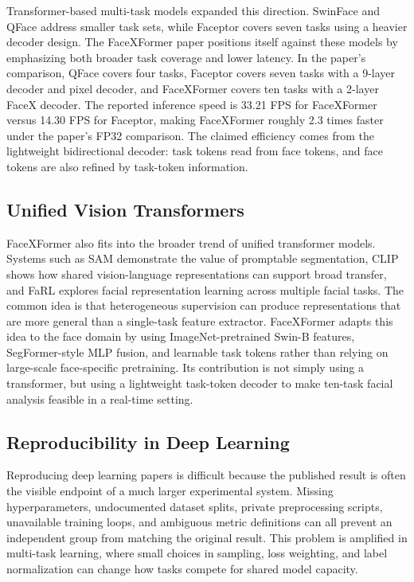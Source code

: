 \documentclass[11pt]{article}
\begin{document}
Transformer-based multi-task models expanded this direction. SwinFace and QFace address smaller task sets, while Faceptor covers seven tasks using a heavier decoder design. The FaceXFormer paper positions itself against these models by emphasizing both broader task coverage and lower latency. In the paper's comparison, QFace covers four tasks, Faceptor covers seven tasks with a 9-layer decoder and pixel decoder, and FaceXFormer covers ten tasks with a 2-layer FaceX decoder. The reported inference speed is 33.21 FPS for FaceXFormer versus 14.30 FPS for Faceptor, making FaceXFormer roughly 2.3 times faster under the paper's FP32 comparison. The claimed efficiency comes from the lightweight bidirectional decoder: task tokens read from face tokens, and face tokens are also refined by task-token information.


\subsection{Unified Vision Transformers}


FaceXFormer also fits into the broader trend of unified transformer models. Systems such as SAM demonstrate the value of promptable segmentation, CLIP shows how shared vision-language representations can support broad transfer, and FaRL explores facial representation learning across multiple facial tasks. The common idea is that heterogeneous supervision can produce representations that are more general than a single-task feature extractor. FaceXFormer adapts this idea to the face domain by using ImageNet-pretrained Swin-B features, SegFormer-style MLP fusion, and learnable task tokens rather than relying on large-scale face-specific pretraining. Its contribution is not simply using a transformer, but using a lightweight task-token decoder to make ten-task facial analysis feasible in a real-time setting.


\subsection{Reproducibility in Deep Learning}


Reproducing deep learning papers is difficult because the published result is often the visible endpoint of a much larger experimental system. Missing hyperparameters, undocumented dataset splits, private preprocessing scripts, unavailable training loops, and ambiguous metric definitions can all prevent an independent group from matching the original result. This problem is amplified in multi-task learning, where small choices in sampling, loss weighting, and label normalization can change how tasks compete for shared model capacity.
\end{document}
